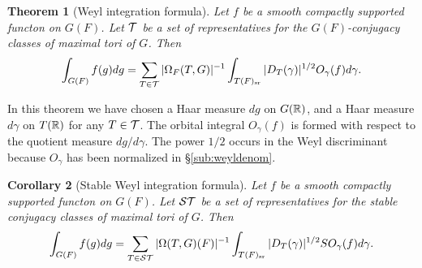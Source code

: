 \documentclass{article}
\newtheorem{thm}{Theorem}[subsection]
\newtheorem{cor}[thm]{Corollary}
\theoremstyle{definition}
\numberwithin{equation}{section}
\renewcommand{\-}{\hyp{}}
\begin{document}
\begin{thm}[Weyl integration formula] \label{thm:weyl}
	Let $f$ be a smooth compactly supported functon on $G(F)$. Let $\mathcal{T}$ be a set of representatives for the $G(F)$-conjugacy classes of maximal tori of $G$.
	Then
	\[ \int_{G(F)}f(g)dg = \sum_{T \in \mathcal{T}}|\Omega_F(T,G)|^{-1}\int_{T(F)_{\textrm{sr}}} |D_T(\gamma)|^{1/2}O_\gamma(f)d\gamma. \]
\end{thm}

In this theorem we have chosen a Haar measure $dg$ on $G(\mathbb{R})$, and a Haar measure $d\gamma$ on $T(\mathbb{R})$ for any $T \in \mathcal{T}$. The orbital integral $O_\gamma(f)$ is formed with respect to the quotient measure $dg/d\gamma$. The power $1/2$ occurs in the Weyl discriminant because $O_\gamma$ has been normalized in \S\ref{sub:weyldenom}.

\begin{cor}[Stable Weyl integration formula] \label{cor:stabweyl}
	Let $f$ be a smooth compactly supported functon on $G(F)$. Let $\mathcal{ST}$ be a set of representatives for the stable conjugacy classes of maximal tori of $G$.
	Then
	\[ \int_{G(F)}f(g)dg = \sum_{T \in \mathcal{ST}}|\Omega(T,G)(F)|^{-1}\int_{T(F)_{\textrm{sr}}} |D_T(\gamma)|^{1/2}SO_\gamma(f)d\gamma. \]
\end{cor}
\end{document}
